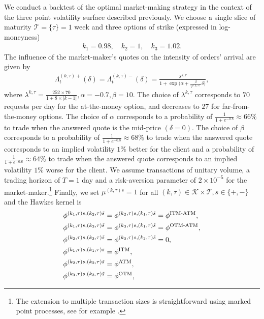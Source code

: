 \documentclass[12pt]{article}
\begin{document}
We conduct a backtest of the optimal market-making strategy in the context of the three point volatility surface described previously. We choose a single slice of maturity $\mathcal{T}=\{\tau\}=1$ week and three options of strike (expressed in log-moneyness)
\begin{align*}
    k_1 = 0.98,\quad  k_2 = 1,\quad  k_3 = 1.02. 
\end{align*}
The influence of the market-maker's quotes on the intensity of orders' arrival are given by 
\begin{align*}
    \Lambda^{(k,\tau)+}_t(\delta) = \Lambda^{(k,\tau)-}_t (\delta) = \frac{\lambda^{k,\tau}}{1+\exp\big(\alpha + \frac{\beta}{\mathcal{V}^{(k,\tau)}}\delta\big)},
\end{align*}
where $\lambda^{k,\tau}=\frac{252\times 70}{1+ 8\times |k-1|}, \alpha = -0.7, \beta = 10$. The choice of $\lambda^{k,\tau}$ corresponds to $70$ requests per day for the at-the-money option, and decreases to $27$ for far-from-the-money options. The choice of $\alpha$ corresponds to a probability of $\frac{1}{1+e^{-0.8}}\approx 66\%$ to trade when the answered quote is the mid-price $(\delta=0)$. The choice of $\beta$ corresponds to a probability of $\frac{1}{1+e^{-0.8}}\approx 68\%$ to trade when the answered quote corresponds to an implied volatility $1\%$ better for the client and a probability of $\frac{1}{1+e^{-0.6}}\approx 64\%$ to trade when the answered quote corresponds to an implied volatility $1\%$ worse for the client. We assume transactions of unitary volume, a trading horizon of $T=1$ day and a risk-aversion parameter of $2\times 10^{-5}$ for the market-maker.\footnote{The extension to multiple transaction sizes is straightforward using marked point processes, see for example \cite{baldacci2019algorithmic}.} Finally, we set $\mu^{(k,\tau)s}= 1$ for all $(k,\tau)\in\mathcal{K}\times\mathcal{T},s\in\{+,-\}$ and the Hawkes kernel is 
\begin{align*}
    & \phi^{(k_1,\tau)s,(k_2,\tau)\tilde{s}} = \phi^{(k_2,\tau)s,(k_1,\tau)\tilde{s}} = \phi^{\text{ITM-ATM}}, \\
    & \phi^{(k_1,\tau)s,(k_3,\tau)\tilde{s}} = \phi^{(k_3,\tau)s,(k_1,\tau)\tilde{s}} = \phi^{\text{OTM-ATM}}, \\
    & \phi^{(k_2,\tau)s,(k_3,\tau)\tilde{s}} = \phi^{(k_3,\tau)s,(k_2,\tau)\tilde{s}} = 0, \\
    & \phi^{(k_1,\tau)s,(k_1,\tau)\tilde{s}} = \phi^{\text{ITM}}, \\
    & \phi^{(k_2,\tau)s,(k_2,\tau)\tilde{s}} = \phi^{\text{ATM}}, \\
    & \phi^{(k_3,\tau)s,(k_3,\tau)\tilde{s}} = \phi^{\text{OTM}}, \vspace{-10mm}
\end{align*}
\end{document}
